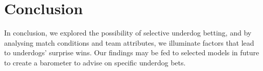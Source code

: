 \documentclass[12pt, a4paper]{article}
\begin{document}
        

\section{Conclusion}

In conclusion, we explored the possibility of selective underdog betting, and by analysing match conditions and team attributes, we illuminate factors that lead to underdogs' surprise wins. Our findings may be fed to selected models in future to create a barometer to advise on specific underdog bets.
\end{document}
